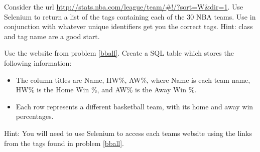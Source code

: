 \begin{problem}\label{bball}
Consider the url \url{http://stats.nba.com/league/team/#!/?sort=W&dir=1}.
Use Selenium to return a list of the  tags containing each of the 30 NBA teams.
Use  in conjunction with whatever unique identifiers get you the correct tags.
Hint: class and tag name are a good start.
\end{problem}

\begin{problem}
Use the website from problem \ref{bball}.
Create a SQL table which stores the following information:
\begin{itemize}
\item The column titles are Name, HW\%, AW\%, where Name is each team name, HW\% is the Home Win \%, and AW\% is the Away Win \%.
\item Each row represents a different basketball team, with its home and away win percentages.
\end{itemize}
Hint: You will need to use Selenium to access each teams website using the links from the tags found in problem \ref{bball}.
\end{problem}